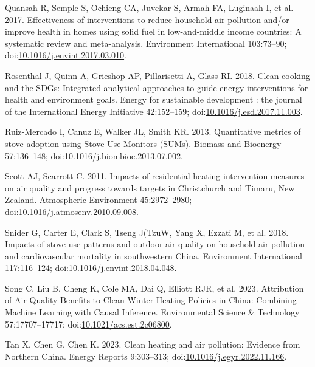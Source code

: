 \documentclass[
  letterpaper,
  DIV=11,
  numbers=noendperiod]{scrartcl}
\newlength{\cslhangindent}
\newlength{\cslentryspacingunit} %
\newenvironment{CSLReferences}[2] %
 {%
  \setlength{\parindent}{0pt}
  \ifodd #1
  \let\oldpar\par
  \def\par{\hangindent=\cslhangindent\oldpar}
  \fi
  \setlength{\parskip}{#2\cslentryspacingunit}
 }%
 {}
\begin{document}
\begin{CSLReferences}{1}{0}
\leavevmode{}%
Quansah R, Semple S, Ochieng CA, Juvekar S, Armah FA, Luginaah I, et al.
2017. Effectiveness of interventions to reduce household air pollution
and/or improve health in homes using solid fuel in low-and-middle income
countries: {A} systematic review and meta-analysis. Environment
International 103:73--90;
doi:\href{https://doi.org/10.1016/j.envint.2017.03.010}{10.1016/j.envint.2017.03.010}.

\leavevmode{}%
Rosenthal J, Quinn A, Grieshop AP, Pillarisetti A, Glass RI. 2018. Clean
cooking and the {SDGs}: {Integrated} analytical approaches to guide
energy interventions for health and environment goals. Energy for
sustainable development : the journal of the International Energy
Initiative 42:152--159;
doi:\href{https://doi.org/10.1016/j.esd.2017.11.003}{10.1016/j.esd.2017.11.003}.

\leavevmode{}%
Ruiz-Mercado I, Canuz E, Walker JL, Smith KR. 2013. Quantitative metrics
of stove adoption using {Stove Use Monitors} ({SUMs}). Biomass and
Bioenergy 57:136--148;
doi:\href{https://doi.org/10.1016/j.biombioe.2013.07.002}{10.1016/j.biombioe.2013.07.002}.

\leavevmode{}%
Scott AJ, Scarrott C. 2011. Impacts of residential heating intervention
measures on air quality and progress towards targets in {Christchurch}
and {Timaru}, {New Zealand}. Atmospheric Environment 45:2972--2980;
doi:\href{https://doi.org/10.1016/j.atmosenv.2010.09.008}{10.1016/j.atmosenv.2010.09.008}.

\leavevmode{}%
Snider G, Carter E, Clark S, Tseng J(TzuW, Yang X, Ezzati M, et al.
2018. Impacts of stove use patterns and outdoor air quality on household
air pollution and cardiovascular mortality in southwestern {China}.
Environment International 117:116--124;
doi:\href{https://doi.org/10.1016/j.envint.2018.04.048}{10.1016/j.envint.2018.04.048}.

\leavevmode{}%
Song C, Liu B, Cheng K, Cole MA, Dai Q, Elliott RJR, et al. 2023.
Attribution of {Air Quality Benefits} to {Clean Winter Heating Policies}
in {China}: {Combining Machine Learning} with {Causal Inference}.
Environmental Science \& Technology 57:17707--17717;
doi:\href{https://doi.org/10.1021/acs.est.2c06800}{10.1021/acs.est.2c06800}.

\leavevmode{}%
Tan X, Chen G, Chen K. 2023. Clean heating and air pollution: {Evidence}
from {Northern China}. Energy Reports 9:303--313;
doi:\href{https://doi.org/10.1016/j.egyr.2022.11.166}{10.1016/j.egyr.2022.11.166}.


\end{CSLReferences}
\end{document}
